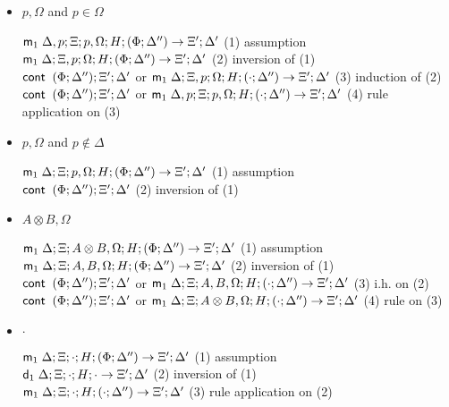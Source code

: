 \begin{itemize}
\item $p, \Omega$ and $p \in \Omega$

$\mathsf{m}_1 \; \Delta, p; \Xi; p, \Omega; H; (\Phi; \Delta'') \rightarrow \Xi'; \Delta'$ \hfill (1) assumption\\
$\mathsf{m}_1 \; \Delta; \Xi, p; \Omega; H; (\Phi; \Delta'') \rightarrow \Xi'; \Delta'$ \hfill (2) inversion of (1)\\
$\mathsf{cont} \; \; (\Phi; \Delta'') ; \Xi'; \Delta'$ or $\mathsf{m}_1 \; \Delta; \Xi, p; \Omega; H; (\cdot; \Delta'') \rightarrow \Xi'; \Delta'$ \hfill (3) induction of (2) \\
$\mathsf{cont} \; \; (\Phi; \Delta'') ; \Xi'; \Delta'$ or $\mathsf{m}_1 \; \Delta, p; \Xi; p, \Omega; H; (\cdot; \Delta'') \rightarrow \Xi'; \Delta'$ \hfill (4) rule application on (3) \\

\item $p, \Omega$ and $p \notin \Delta$

$\mathsf{m}_1 \; \Delta; \Xi; p, \Omega; H; (\Phi; \Delta'') \rightarrow \Xi'; \Delta'$ \hfill (1) assumption \\
$\mathsf{cont} \; \; (\Phi; \Delta''); \Xi'; \Delta'$ \hfill (2) inversion of (1) \\

\item $A \otimes B, \Omega$

$\mathsf{m}_1 \; \Delta; \Xi; A \otimes B, \Omega; H; (\Phi; \Delta'') \rightarrow \Xi'; \Delta'$ \hfill (1) assumption \\
$\mathsf{m}_1 \; \Delta; \Xi; A, B, \Omega; H; (\Phi; \Delta'') \rightarrow \Xi'; \Delta'$ \hfill (2) inversion of (1) \\
$\mathsf{cont} \; \; (\Phi; \Delta''); \Xi'; \Delta'$ or $\mathsf{m}_1 \; \Delta; \Xi; A, B, \Omega; H; (\cdot; \Delta'') \rightarrow \Xi'; \Delta'$ \hfill (3) i.h. on (2) \\
$\mathsf{cont} \; \; (\Phi; \Delta''); \Xi'; \Delta'$ or $\mathsf{m}_1 \; \Delta; \Xi; A \otimes B, \Omega; H; (\cdot; \Delta'') \rightarrow \Xi'; \Delta'$ \hfill (4) rule on (3) \\

\item $\cdot$

$\mathsf{m}_1 \; \Delta; \Xi; \cdot; H; (\Phi; \Delta'') \rightarrow \Xi'; \Delta'$ \hfill (1) assumption \\
$\mathsf{d}_1 \; \Delta; \Xi; \cdot; H; \cdot \rightarrow \Xi'; \Delta'$ \hfill (2) inversion of (1) \\
$\mathsf{m}_1 \; \Delta; \Xi; \cdot; H; (\cdot; \Delta'') \rightarrow \Xi'; \Delta'$ \hfill (3) rule application on (2) \\
\end{itemize}

